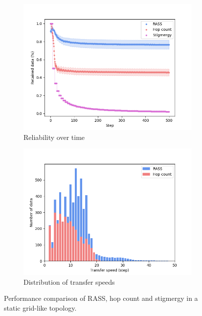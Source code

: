 \begin{figure}
    \centering
    \begin{subfigure}{0.8\textwidth}
        \includegraphics[width=\textwidth]{images/grid_reliability.png}
        \caption{Reliability over time}
        \label{results:grid_100_reliability}
    \end{subfigure}
    \begin{subfigure}{0.8\textwidth}
        \includegraphics[width=\textwidth]{images/grid_speed.png}
        \caption{Distribution of transfer speeds}
        \label{results:grid_100_speed}
    \end{subfigure}
    \caption{Performance comparison of RASS, hop count and stigmergy in a static grid-like topology.}
    \label{results:staticTopology}
    \vspace{-2mm}
\end{figure}

